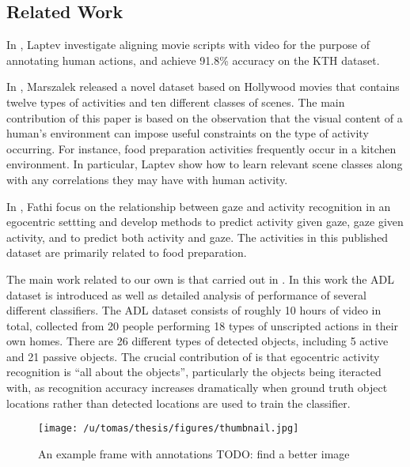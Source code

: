 \documentclass[10pt,twocolumn,letterpaper]{article}
\begin{document}

\subsection{Related Work}


	In \cite{Laptev08}, Laptev \etal investigate aligning movie scripts with
	video for the purpose of annotating human actions, and achieve 91.8\%
	accuracy on the KTH dataset.
	
	In \cite{Marszalek09}, Marszalek \etal released a novel dataset based on
	Hollywood movies that contains twelve types of activities and ten
	different classes of scenes. The main contribution of this paper is based
	on the observation that the visual content of a human's environment can
	impose useful constraints on the type of activity occurring. For instance,
	food preparation activities frequently occur in a kitchen environment. In
	particular, Laptev \etal show how to learn relevant scene classes along
	with any correlations they may have with human activity.
	
	In \cite{Fathi12}, Fathi \etal focus on the relationship between gaze and
	activity recognition in an egocentric settting and develop methods to
	predict activity given gaze, gaze given activity, and to predict both
	activity and gaze. The activities in this
	published dataset are primarily related to food preparation. 
	
	The main work related to our own is that carried out in \cite{Ramanan12}. 
	In this work the ADL dataset is introduced as well as detailed analysis of
	performance of several different classifiers. The ADL dataset consists of
	roughly 10 hours of video in total, collected from 20 people performing
	18 types of unscripted actions in their own homes. There are 26 different 
	types of detected objects, including 5 active and 21 passive objects. 
	The crucial contribution of
	\cite{Ramanan12} is that egocentric activity recognition is ``all about
	the objects'', particularly the objects being iteracted with, as
	recognition accuracy increases dramatically when ground truth object
	locations rather than detected locations are used to train the classifier. 

	\begin{figure}[t]
		\begin{center}
			  \texttt{[image: /u/tomas/thesis/figures/thumbnail.jpg]}
		\end{center}
		   \caption{An example frame with annotations TODO: find a better image}
				\label{fig:long}
				\label{fig:onecol}
	\end{figure}
	
\end{document}
